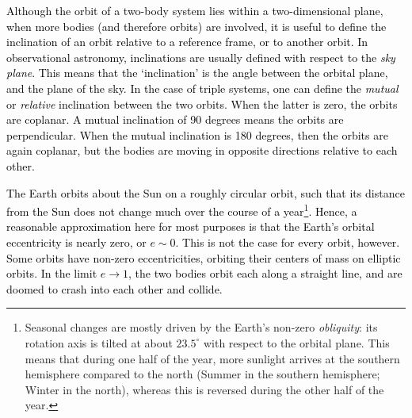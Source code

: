 \documentclass[main.tex]{subfiles}
\begin{document}
\begin{tcolorbox}[sharp corners, colback=red!30, colframe=red!80!blue, title=Orbital Inclination$^3$]
\par \textcolor{black}{ Although the orbit of a two-body system lies within a two-dimensional plane, when more bodies (and therefore orbits) are involved, it is useful to define the inclination of an orbit relative to a reference frame, or to another orbit. In observational astronomy, inclinations are usually defined with respect to the {\it sky plane}. This means that the `inclination' is the angle between the orbital plane, and the plane of the sky. In the case of triple systems, one can define the {\it mutual} or {\it relative} inclination between the two orbits. When the latter is zero, the orbits are coplanar. A mutual inclination of 90 degrees means the orbits are perpendicular. When the mutual inclination is 180 degrees, then the orbits are again coplanar, but the bodies are moving in opposite directions relative to each other. }  
\end{tcolorbox}



\begin{tcolorbox}[sharp corners, colback=red!30, colframe=red!80!blue, title=Orbital Eccentricity$^4$]
\par \textcolor{black}{The Earth orbits about the Sun on a roughly circular orbit, such that its distance from the Sun does not change much over the course of a year\footnote{Seasonal changes are mostly driven by the Earth's non-zero {\it obliquity}: its rotation axis is tilted at about $23.5^\circ$ with respect to the orbital plane. This means that during one half of the year, more sunlight arrives at the southern hemisphere compared to the north (Summer in the southern hemisphere; Winter in the north), whereas this is reversed during the other half of the year. }. Hence, a reasonable approximation here for most purposes is that the Earth's orbital eccentricity is nearly zero, or $e \sim 0$.  This is not the case for every orbit, however.  Some orbits have non-zero eccentricities, orbiting their centers of mass on elliptic orbits.  In the limit $e \rightarrow 1$, the two bodies orbit each along a straight line, and are doomed to crash into each other and collide.}
\end{tcolorbox}
\end{document}
